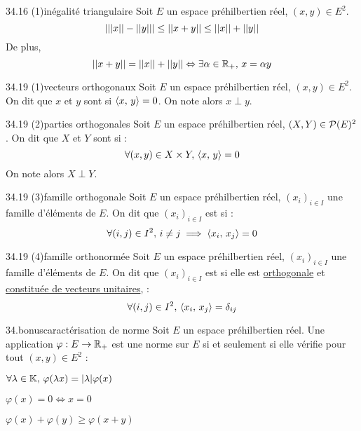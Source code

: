 \begin{adjustwidth}{-3cm}{-3cm}
\begin{theoreme}{34.16 (1)}{inégalité triangulaire}
    Soit $E$ un espace préhilbertien réel, $(x,y) \in E^2$.
    $$|||x||-{||y||}| \leq ||x+y|| \leq ||x|| + ||y||$$
    De plus, 
    $$||x+y|| = ||x|| + ||y|| \Leftrightarrow \exists \alpha \in \mathbb{R}_+, \,x = \alpha y$$
\end{theoreme}

\begin{definition}{34.19 (1)}{vecteurs orthogonaux}
    Soit $E$ un espace préhilbertien réel, $(x,y) \in E^2$.
    On dit que $x$ et $y$ sont  si $\left\langle x ,\, y \right\rangle = 0$. On note alors $x \perp y$.
\end{definition}

\begin{definition}{34.19 (2)}{parties orthogonales}
    Soit $E$ un espace préhilbertien réel, $(X,Y) \in \mathcal{P}(E)^2$.
    On dit que $X$ et $Y$ sont  si :
    $$\forall (x,y) \in X \times Y, \,\left\langle x ,\, y \right\rangle = 0$$
    On note alors $X \perp Y$.
\end{definition}

\begin{definition}{34.19 (3)}{famille orthogonale}
    Soit $E$ un espace préhilbertien réel, $(x_i)_{i \in I}$ une famille d'éléments de $E$.
    On dit que $(x_i)_{i \in I}$ est  si :
    $$\forall (i,j) \in I^2,\, i \neq j \implies \left\langle x_i ,\, x_j \right\rangle = 0$$
\end{definition}

\begin{definition}{34.19 (4)}{famille orthonormée}
    Soit $E$ un espace préhilbertien réel, $(x_i)_{i \in I}$ une famille d'éléments de $E$.
    On dit que $(x_i)_{i \in I}$ est  si elle est \underline{orthogonale} et \underline{constituée de vecteurs unitaires}, \ie :
    $$\forall (i,j) \in I^2, \,\left\langle x_i ,\, x_j \right\rangle = \delta_{ij}$$
\end{definition}

\begin{proposition}{34.bonus}{caractérisation de norme}
    Soit $E$ un espace préhilbertien réel. Une application $\varphi : E \to \mathbb{R}_+$ est une norme sur $E$ si et seulement si elle vérifie pour tout $(x,y) \in E^2$ :  
    \begin{enumeratebf}
        \item $\forall \lambda \in \mathbb{K},\, \varphi(\lambda x) = |\lambda| \varphi(x)$
        \item $\varphi(x) = 0 \Leftrightarrow x = 0$
        \item $\varphi(x) + \varphi(y) \geq \varphi(x + y)$
    \end{enumeratebf}
    

\end{proposition}
\end{adjustwidth}
